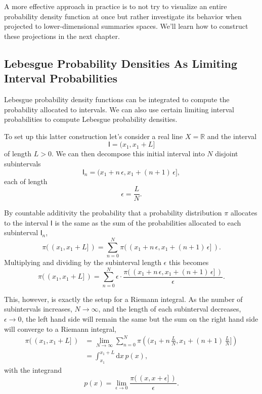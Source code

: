 \documentclass[
  letterpaper,
  DIV=11,
  numbers=noendperiod]{scrartcl}
\begin{document}
A more effective approach in practice is to not try to visualize an
entire probability density function at once but rather investigate its
behavior when projected to lower-dimensional summaries spaces. We'll
learn how to construct these projections in the next chapter.

\hypertarget{lebesgue-probability-densities-as-limiting-interval-probabilities}{%
\subsection{Lebesgue Probability Densities As Limiting Interval
Probabilities}\label{lebesgue-probability-densities-as-limiting-interval-probabilities}}

Lebesgue probability density functions can be integrated to compute the
probability allocated to intervals. We can also use certain limiting
interval probabilities to compute Lebesgue probability densities.

To set up this latter construction let's consider a real line
\(X = \mathbb{R}\) and the interval \[
\mathsf{I} = (x_{1}, x_{1} + L ]
\] of length \(L > 0\). We can then decompose this initial interval into
\(N\) disjoint subintervals \[
\mathsf{I}_{n}
= ( x_{1} + n \, \epsilon , x_{1} + (n + 1) \, \epsilon ],
\] each of length \[
\epsilon = \frac{L}{N}.
\]

By countable additivity the probability that a probability distribution
\(\pi\) allocates to the interval \(\mathsf{I}\) is the same as the sum
of the probabilities allocated to each subinterval \(\mathsf{I}_{n}\),
\[
\pi( \, ( x_{1}, x_{1} + L ] \, )
=
\sum_{n = 0}^{N}
\pi( \, ( x_{1} + n \, \epsilon , x_{1} + (n + 1) \, \epsilon ] \, ).
\] Multiplying and dividing by the subinterval length \(\epsilon\) this
becomes \[
\pi( \, ( x_{1}, x_{1} + L ] \, )
=
\sum_{n = 0}^{N} \epsilon \cdot
\frac{
\pi( \, ( x_{1} + n \, \epsilon, x_{1} + (n + 1) \, \epsilon ] \, )
}{ \epsilon }.
\]

This, however, is exactly the setup for a Riemann integral. As the
number of subintervals increases, \(N \rightarrow \infty\), and the
length of each subinterval decreases, \(\epsilon \rightarrow 0\), the
left hand side will remain the same but the sum on the right hand side
will converge to a Riemann integral, \begin{align*}
\pi( \, ( x_{1}, x_{1} + L ] \, )
&=
\lim_{N \rightarrow \infty}
\sum_{n = 0}^{N}
\pi \left( ( x_{1} + n \, \frac{L}{N},
             x_{1} + (n + 1) \, \frac{L}{N} ] \right)
\\
&=
\int_{x_{1}}^{x_{1} + L} \mathrm{d} x \, p(x),
\end{align*} with the integrand \[
p(x) = \lim_{\epsilon \rightarrow 0}
\frac{ \pi( \, ( x, x + \epsilon ] \, ) }{ \epsilon }.
\]
\end{document}
